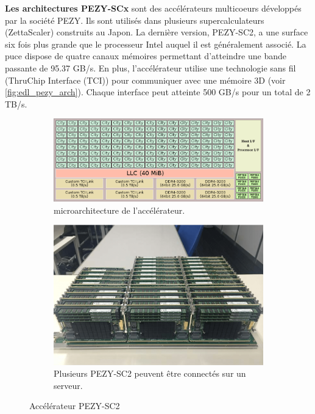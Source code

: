         \textbf{Les architectures PEZY-SCx} sont des accélérateurs multicoeurs développés par la société PEZY.  Ils sont utilisés dans plusieurs supercalculateurs (ZettaScaler) construits au Japon. La dernière version, PEZY-SC2, a une surface six fois plus grande que le processeur Intel auquel il est généralement associé. La puce dispose de quatre canaux mémoires permettant d'atteindre une bande passante de 95.37 GB/s. En plus, l'accélérateur utilise une technologie sans fil (ThruChip Interface (TCI)) pour communiquer avec une mémoire 3D (voir \autoref{fig:edl_pezy_arch}). Chaque interface peut atteinte 500 GB/s pour un total de 2 TB/s. 
          
        \begin{figure}[t!]
            \centering
            \begin{subfigure}[t]{0.48\textwidth}
                \centering
                \includegraphics[width=\linewidth]{images/edl_pezy_arch.png}
                \caption{\label{fig:edl_pezy_arch}microarchitecture de l'accélérateur.}
            \end{subfigure}\hfill
            \begin{subfigure}[t]{0.48\textwidth}
                \centering
                \includegraphics[width=\linewidth]{images/edl_pezzy_board.png}
                \caption{\label{fig:edl_pezzy_board}Plusieurs PEZY-SC2 peuvent être connectés sur un serveur.}
            \end{subfigure}
            \caption{\label{fig:pezy} Accélérateur PEZY-SC2 \cite{RyutaroHimenoToshikazuEbisuzaki2018}}
        \end{figure}
        
